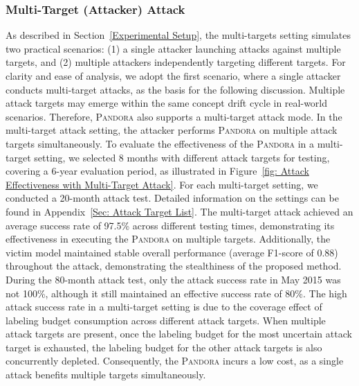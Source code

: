 \documentclass[lettersize,journal]{IEEEtran}
\newcommand{\pandora}{{\scshape Pandora}\xspace}
\begin{document}
\subsubsection{Multi-Target (Attacker) Attack} 
\label{Sec: Multi Attack Targets}
As described in Section~\ref{Experimental Setup}, the multi-targets setting simulates two practical scenarios: (1) a single attacker launching attacks against multiple targets, and (2) multiple attackers independently targeting different targets.
For clarity and ease of analysis, we adopt the first scenario, where a single attacker conducts multi-target attacks, as the basis for the following discussion.
Multiple attack targets may emerge within the same concept drift cycle in real-world scenarios. 
Therefore, \pandora also supports a multi-target attack mode.
In the multi-target attack setting, the attacker performs \pandora on multiple attack targets simultaneously.
To evaluate the effectiveness of the \pandora in a multi-target setting, we selected 8 months with different attack targets for testing, covering a 6-year evaluation period, as illustrated in Figure~\ref{fig: Attack Effectiveness with Multi-Target Attack}.
For each multi-target setting, we conducted a 20-month attack test.
Detailed information on the settings can be found in Appendix~\ref{Sec: Attack Target List}.
The multi-target attack achieved an average success rate of 97.5\% across different testing times, demonstrating its effectiveness in executing the \pandora on multiple targets.
Additionally, the victim model maintained stable overall performance (average F1-score of 0.88) throughout the attack, demonstrating the stealthiness of the proposed method.
During the 80-month attack test, only the attack success rate in May 2015 was not 100\%, although it still maintained an effective success rate of 80\%.
The high attack success rate in a multi-target setting is due to the coverage effect of labeling budget consumption across different attack targets.
When multiple attack targets are present, once the labeling budget for the most uncertain attack target is exhausted, the labeling budget for the other attack targets is also concurrently depleted.
Consequently, the \pandora incurs a low cost, as a single attack benefits multiple targets simultaneously.
\end{document}
